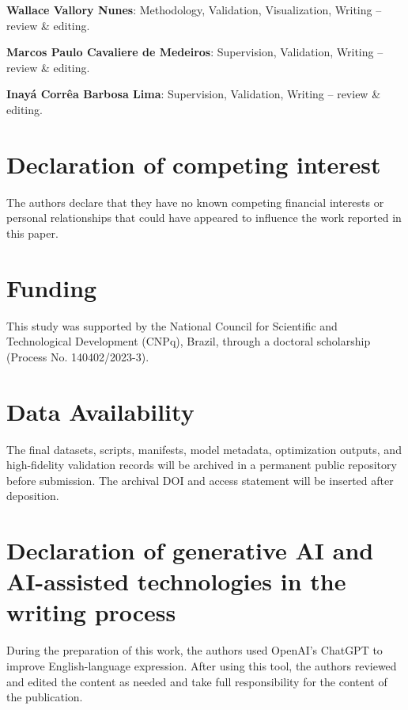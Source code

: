 \documentclass[12pt]{elsarticle}
\begin{document}
	\textbf{Wallace Vallory Nunes}: Methodology, Validation, Visualization,
	Writing -- review \& editing.
	
	\textbf{Marcos Paulo Cavaliere de Medeiros}: Supervision, Validation,
	Writing -- review \& editing.
	
	\textbf{Inay\'a Corr\^ea Barbosa Lima}: Supervision, Validation,
	Writing -- review \& editing.
		
	\section*{Declaration of competing interest}
	The authors declare that they have no known competing financial interests or personal relationships that could have appeared to influence the work reported in this paper.

	\section*{Funding}
	This study was supported by the National Council for Scientific and Technological Development (CNPq), Brazil, through a doctoral scholarship (Process No. 140402/2023-3).
	
	\section*{Data Availability}
	The final datasets, scripts, manifests, model metadata, optimization outputs, and high-fidelity validation records will be archived in a permanent public repository before submission. The archival DOI and access statement will be inserted after deposition.

	\section*{Declaration of generative AI and AI-assisted technologies in the writing process}
	During the preparation of this work, the authors used OpenAI's ChatGPT to improve English-language expression. After using this tool, the authors reviewed and edited the content as needed and take full responsibility for the content of the publication.
	
	
	
	
\end{document}
